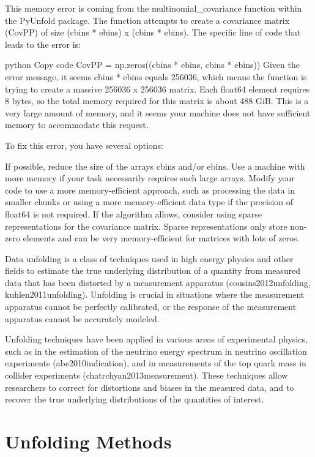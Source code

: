    This memory error is coming from the multinomial\_covariance function within the PyUnfold package. The function attempts to create a covariance matrix (CovPP) of size (cbins * ebins) x (cbins * ebins). The specific line of code that leads to the error is:
    
    python
    Copy code
    CovPP = np.zeros((cbins * ebins, cbins * ebins))
    Given the error message, it seems cbins * ebins equals 256036, which means the function is trying to create a massive 256036 x 256036 matrix. Each float64 element requires 8 bytes, so the total memory required for this matrix is about 488 GiB. This is a very large amount of memory, and it seems your machine does not have sufficient memory to accommodate this request.
    
    To fix this error, you have several options:
    
    If possible, reduce the size of the arrays cbins and/or ebins.
    Use a machine with more memory if your task necessarily requires such large arrays.
    Modify your code to use a more memory-efficient approach, such as processing the data in smaller chunks or using a more memory-efficient data type if the precision of float64 is not required.
    If the algorithm allows, consider using sparse representations for the covariance matrix. Sparse representations only store non-zero elements and can be very memory-efficient for matrices with lots of zeros.
    
    \fi
    Data unfolding is a class of techniques used in high energy physics and other fields to estimate the true underlying distribution of a quantity from measured data that has been distorted by a measurement apparatus (cousins2012unfolding, kuhlen2011unfolding). Unfolding is crucial in situations where the measurement apparatus cannot be perfectly calibrated, or the response of the measurement apparatus cannot be accurately modeled.
    
    Unfolding techniques have been applied in various areas of experimental physics, such as in the estimation of the neutrino energy spectrum in neutrino oscillation experiments (abe2010indication), and in measurements of the top quark mass in collider experiments (chatrchyan2013measurement). These techniques allow researchers to correct for distortions and biases in the measured data, and to recover the true underlying distributions of the quantities of interest.
    
\clearpage
\section{Unfolding Methods}


